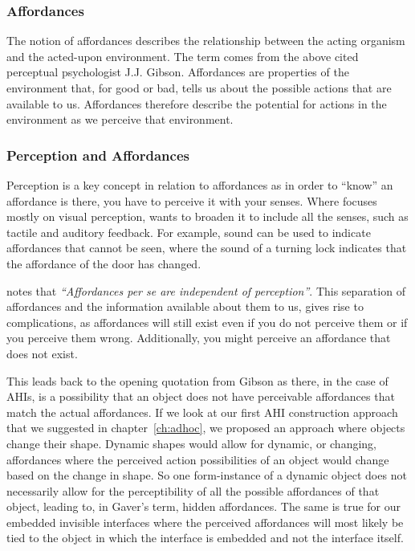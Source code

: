 \subsubsection{Affordances}
The notion of affordances describes the relationship between the acting organism and the acted-upon environment.
The term comes from the above cited perceptual psychologist J.J. Gibson.
Affordances are properties of the environment that, for good or bad, tells us about the possible actions that are available to us.
Affordances therefore describe the potential for actions in the environment as we perceive that environment.  

\subsubsection{Perception and Affordances}
Perception is a key concept in relation to affordances as in order to ``know'' an affordance is there, you have to perceive it with your senses. Where \citet{gibson1979ecological} focuses mostly on visual perception, \citet{gaver1991technology} wants to broaden it to include all the senses, such as tactile and auditory feedback.
For example, sound can be used to indicate affordances that cannot be seen, where the sound of a turning lock indicates that the affordance of the door has changed.

\citet{gaver1991technology} notes that \emph{``Affordances per se are independent of perception''}.
This separation of affordances and the information available about them to us, gives rise to complications, as affordances will still exist even if you do not perceive them or if you perceive them wrong.
Additionally, you might perceive an affordance that does not exist.

This leads back to the opening quotation from Gibson as there, in the case of AHIs, is a possibility that an object does not have perceivable affordances that match the actual affordances.
If we look at our first AHI construction approach that we suggested in chapter~\ref{ch:adhoc}, we proposed an approach where objects change their shape.
Dynamic shapes would allow for dynamic, or changing, affordances where the perceived action possibilities of an object would change based on the change in shape.
So one form-instance of a dynamic object does not necessarily allow for the perceptibility of all the possible affordances of that object, leading to, in Gaver's term, hidden affordances. 
The same is true for our embedded invisible interfaces where the perceived affordances will most likely be tied to the object in which the interface is embedded and not the interface itself.

